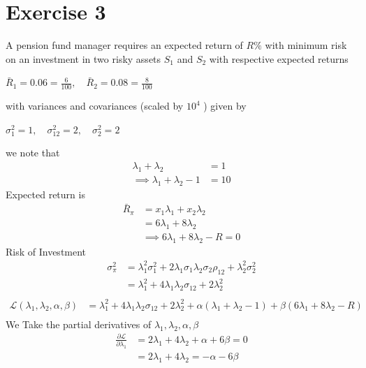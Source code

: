 \documentclass[12pt,a4paper]{article}
\begin{document}
\section*{Exercise 3}
A pension fund manager requires an expected return of $ R\%$ with minimum risk on an investment in two risky assets $S_1$ and $S_2$ with respective expected returns
\begin{spacing}{2.125}
		$\bar{R}_1   = 0.06  =  \frac{6}{100},  \quad   \bar{R}_2   = 0.08   =  \frac{8}{100}$
\end{spacing}
with variances and covariances (scaled by $10^4$ ) given by
\begin{spacing}{2.125}
		$ \sigma_1^2  =  1 , \quad \sigma_{12}^2  =  2, \quad \sigma_2^2  =  2$
\end{spacing}
we note that 
\begin{align*}
		\lambda_1 + \lambda_2  &=  1\\
	   \implies  \lambda_1 + \lambda_2  -1  &=  10
\end{align*}
Expected return  is 
\begin{align*}
			\bar{R}_{\pi}  &=  x_1 \lambda_1 + x_2  \lambda_2\\
			  &= 6 \lambda_1  + 8 \lambda_2 \\
			 & \implies    6 \lambda_1  + 8 \lambda_2 - R =  0
\end{align*}
Risk of Investment
\begin{align*}
 			\sigma_{\pi}^2  &=  \lambda_1^2 \sigma_1^2   + 2 \lambda_1 \sigma_1 \lambda_2 \sigma_2 \rho_{12}  + \lambda_2^2 \sigma_2^2\\
 			&=  \lambda_1^2  + 4 \lambda_1 \lambda_2  \sigma_{12}  + 2 \lambda_2^2 \\
\end{align*}
\begin{align*}
		\mathcal{L} \left(  \lambda_1, \lambda_2, \alpha, \beta  \right) &=   \lambda_1^2  + 4 \lambda_1 \lambda_2  \sigma_{12}  + 2 \lambda_2^2 +  \alpha \left(  \lambda_1 + \lambda_2 -  1  \right)  + \beta \left(6 \lambda_1  + 8 \lambda_2  -  R   \right)\\
\end{align*}
We Take the partial derivatives of $\lambda_1,  \lambda_2 , \alpha,  \beta$ 
\begin{align*}
		\frac{ \partial \mathcal{L}  }{  \partial \lambda_1}   &=  2 \lambda_1  + 4 \lambda_2  + \alpha + 6 \beta  = 0\\
		&=  2 \lambda_1  + 4 \lambda_2 =  - \alpha -  6 \beta 
\end{align*}
\end{document}
